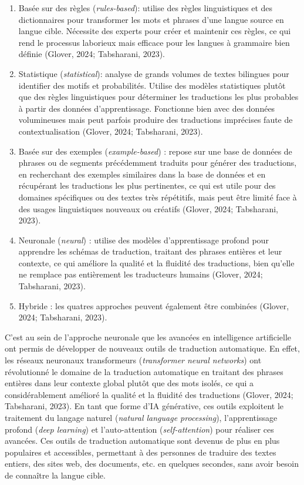 \documentclass[
  letterpaper,
  DIV=11,
  numbers=noendperiod]{scrreprt}
\providecommand{\tightlist}{%
  \setlength{\itemsep}{0pt}\setlength{\parskip}{0pt}}\usepackage{longtable,booktabs,array}
\begin{document}
\begin{enumerate}
\def\labelenumi{\arabic{enumi}.}
\tightlist
\item
  Basée sur des règles (\emph{rules-based}): utilise des règles
  linguistiques et des dictionnaires pour transformer les mots et
  phrases d'une langue source en langue cible. Nécessite des experts
  pour créer et maintenir ces règles, ce qui rend le processus laborieux
  mais efficace pour les langues à grammaire bien définie (Glover, 2024;
  Tabsharani, 2023).
\item
  Statistique (\emph{statistical}): analyse de grands volumes de textes
  bilingues pour identifier des motifs et probabilités. Utilise des
  modèles statistiques plutôt que des règles linguistiques pour
  déterminer les traductions les plus probables à partir des données
  d'apprentissage. Fonctionne bien avec des données volumineuses mais
  peut parfois produire des traductions imprécises faute de
  contextualisation (Glover, 2024; Tabsharani, 2023).
\item
  Basée sur des exemples (\emph{example-based}) : repose sur une base de
  données de phrases ou de segments précédemment traduits pour générer
  des traductions, en recherchant des exemples similaires dans la base
  de données et en récupérant les traductions les plus pertinentes, ce
  qui est utile pour des domaines spécifiques ou des textes très
  répétitifs, mais peut être limité face à des usages linguistiques
  nouveaux ou créatifs (Glover, 2024; Tabsharani, 2023).
\item
  Neuronale (\emph{neural}) : utilise des modèles d'apprentissage
  profond pour apprendre les schémas de traduction, traitant des phrases
  entières et leur contexte, ce qui améliore la qualité et la fluidité
  des traductions, bien qu'elle ne remplace pas entièrement les
  traducteurs humains (Glover, 2024; Tabsharani, 2023).
\item
  Hybride : les quatres approches peuvent également être combinées
  (Glover, 2024; Tabsharani, 2023).
\end{enumerate}

C'est au sein de l'approche neuronale que les avancées en intelligence
artificielle ont permis de développer de nouveaux outils de traduction
automatique. En effet, les réseaux neuronaux transformeurs
(\emph{transformer neural networks}) ont révolutionné le domaine de la
traduction automatique en traitant des phrases entières dans leur
contexte global plutôt que des mots isolés, ce qui a considérablement
amélioré la qualité et la fluidité des traductions (Glover, 2024;
Tabsharani, 2023). En tant que forme d'IA générative, ces outils
exploitent le traitement du langage naturel (\emph{natural language
processing}), l'apprentissage profond (\emph{deep learning}) et
l'auto-attention (\emph{self-attention}) pour réaliser ces avancées. Ces
outils de traduction automatique sont devenus de plus en plus populaires
et accessibles, permettant à des personnes de traduire des textes
entiers, des sites web, des documents, etc. en quelques secondes, sans
avoir besoin de connaître la langue cible.
\end{document}
